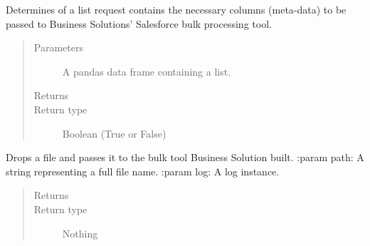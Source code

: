 \documentclass[letterpaper,10pt,english]{sphinxmanual}
\begin{document}
\begin{fulllineitems}
\label{\detokenize{index:ListManagement.utility.general.determine_move_to_bulk_processing}}
Determines of a list request contains the necessary columns (meta-data)
to be passed to Business Solutions’ Salesforce bulk processing tool.
\begin{quote}\begin{description}
\item[{Parameters}] \leavevmode
{} \textendash{} A pandas data frame containing a list.

\item[{Returns}] \leavevmode


\item[{Return type}] \leavevmode
Boolean (True or False)

\end{description}\end{quote}

\end{fulllineitems}


\begin{fulllineitems}
\label{\detokenize{index:ListManagement.utility.general.drop_in_bulk_processing}}
Drops a file and passes it to the bulk tool Business Solution built.
:param path: A string representing a full file name.
:param log: A log instance.
\begin{quote}\begin{description}
\item[{Returns}] \leavevmode


\item[{Return type}] \leavevmode
Nothing

\end{description}\end{quote}

\end{fulllineitems}

\end{document}

